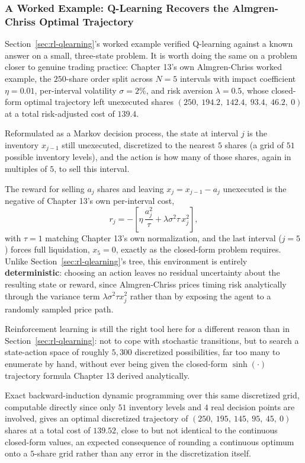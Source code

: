 \documentclass[../ai_in_finance]{subfiles}
\begin{document}
\subsubsection*{A Worked Example: Q-Learning Recovers the Almgren-Chriss Optimal Trajectory}
\label{sec:rl-execution-worked}

Section~\ref{sec:rl-qlearning}'s worked example verified Q-learning against a known answer on a small, three-state problem. It is worth doing the same on a problem closer to genuine trading practice: Chapter 13's own Almgren-Chriss worked example, the $250$-share order split across $N=5$ intervals with impact coefficient $\eta=0.01$, per-interval volatility $\sigma=2\%$, and risk aversion $\lambda=0.5$, whose closed-form optimal trajectory left unexecuted shares $(250,\ 194.2,\ 142.4,\ 93.4,\ 46.2,\ 0)$ at a total risk-adjusted cost of $139.4$.

Reformulated as a Markov decision process, the state at interval $j$ is the inventory $x_{j-1}$ still unexecuted, discretized to the nearest $5$ shares (a grid of $51$ possible inventory levels), and the action is how many of those shares, again in multiples of $5$, to sell this interval.

The reward for selling $a_j$ shares and leaving $x_j=x_{j-1}-a_j$ unexecuted is the negative of Chapter 13's own per-interval cost,
\begin{equation*}
r_j = -\left[\eta\,\frac{a_j^2}{\tau} + \lambda\sigma^2\tau\, x_j^2\right],
\end{equation*}
with $\tau=1$ matching Chapter 13's own normalization, and the last interval ($j=5$) forces full liquidation, $x_5=0$, exactly as the closed-form problem requires. Unlike Section~\ref{sec:rl-qlearning}'s tree, this environment is entirely \textbf{deterministic}: choosing an action leaves no residual uncertainty about the resulting state or reward, since Almgren-Chriss prices timing risk analytically through the variance term $\lambda\sigma^2\tau x_j^2$ rather than by exposing the agent to a randomly sampled price path.

Reinforcement learning is still the right tool here for a different reason than in Section~\ref{sec:rl-qlearning}: not to cope with stochastic transitions, but to search a state-action space of roughly $5{,}300$ discretized possibilities, far too many to enumerate by hand, without ever being given the closed-form $\sinh(\cdot)$ trajectory formula Chapter 13 derived analytically.

Exact backward-induction dynamic programming over this same discretized grid, computable directly since only $51$ inventory levels and $4$ real decision points are involved, gives an optimal discretized trajectory of $(250,\ 195,\ 145,\ 95,\ 45,\ 0)$ shares at a total cost of $139.52$, close to but not identical to the continuous closed-form values, an expected consequence of rounding a continuous optimum onto a $5$-share grid rather than any error in the discretization itself.
\end{document}
